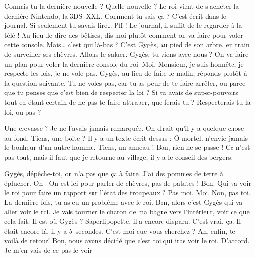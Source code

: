 \documentclass[12pt, a5paper, french]{memoir}
\begin{document}
\newpage
\pagestyle{myps}
\begin{linenumbers}


\StageDir{\Gyges, \Bonnie, \Clyde}
\begin{drama}
\Bonniespeaks Connais-tu la dernière nouvelle ?
\Clydespeaks Quelle nouvelle ?
\Bonniespeaks Le roi vient de s’acheter la dernière Nintendo, la 3DS~XXL.
\Clydespeaks Comment tu sais ça ?
\Bonniespeaks C’est écrit dans le journal. Si seulement tu savais lire\dots
\Clydespeaks Pff ! Le journal, il suffit de le regarder à la télé !
\Bonniespeaks Au lieu de dire des bêtises, dis-moi plutôt comment on va faire pour voler cette console.
\Clydespeaks Mais\dots{} c’est qui là-bas ?
\Bonniespeaks C’est Gygès, au pied de son arbre, en train de surveiller ses chèvres.
\Clydespeaks Allons le saluer.  Gygès, tu viens avec nous ? On va faire un plan pour voler la dernière console du roi.
\Gygesspeaks Moi, Monsieur, je suis honnête, je respecte les lois, je ne vole pas.
\newpage
\Bonniespeaks Gygès, au lieu de faire le malin, réponds plutôt à la question suivante. Tu ne voles pas, car tu as peur de te faire arrêter, ou parce que tu penses que c’est bien de respecter la loi ? Si tu avais de super-pouvoirs tout en étant certain de ne pas te faire attraper, que ferais-tu ? Respecterais-tu la loi, ou pas ?

\scene[L’anneau]
\StageDir{\Gyges}
\Gygesspeaks Une crevasse ? Je ne l’avais jamais remarquée. On dirait qu’il y a quelque chose au fond. Tiens, une boite ? Il y a un texte écrit dessus : \og Ô mortel, n’envie jamais le bonheur d’un autre homme. \fg{}  Tiens, un anneau !  Bon, rien ne se passe ! Ce n’est pas tout, mais il faut que je retourne au village, il y a le conseil des bergers.
\newpage

\scene[Le messager]
\StageDir{\Gyges, \Leonardo, \Donatello, \Michelangelo, \Raffaello, \Tiziano}
\Leonardospeaks Gygès, dépêche-toi, on n’a pas que ça à faire. J’ai des pommes de terre à éplucher.
\Donatellospeaks Oh ! On est ici pour parler de chèvres, pas de patates !
\Michelangelospeaks Bon. Qui va voir le roi pour faire un rapport sur l'état des troupeaux ?
\Raffaellospeaks Pas moi.
\Tizianospeaks Moi.
\Donatellospeaks Non, pas toi. La dernière fois, tu as eu un problème avec le roi.
\Leonardospeaks Bon, alors c’est Gygès qui va aller voir le roi.
\Gygesspeaks {} Je vais tourner le chaton de ma bague vers l’intérieur, voir ce que cela fait.
\Leonardospeaks Il est où Gygès ? Saperlipopette, il a encore disparu.
\Raffaellospeaks C’est vrai, ça. Il était encore là, il y a 5~secondes.
\newpage
\Gygesspeaks {} C’est moi que vous cherchez ?
\Tizianospeaks Ah, enfin, te voilà de retour! Bon, nous avons décidé que c’est toi qui iras voir le roi.
\Gygesspeaks D’accord. Je m’en vais de ce pas le voir.


\end{drama}
\end{linenumbers}
\end{document}
